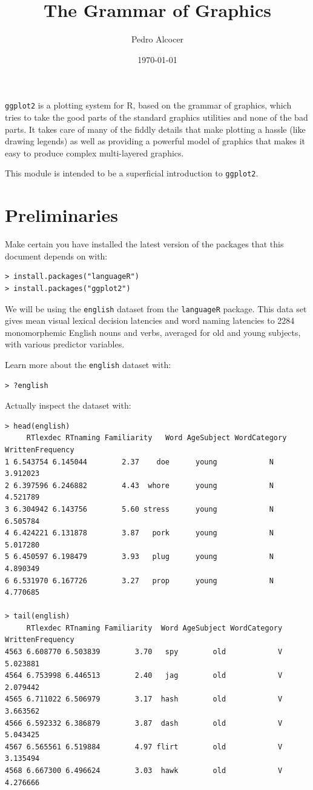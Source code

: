 \documentclass[oneside, 10pt]{article}
\title{The Grammar of Graphics}
\author{Pedro Alcocer}
\date{\today}
\begin{document}
\maketitle

\noindent\texttt{ggplot2} is a plotting system for R, based on the grammar of graphics, which tries to take the good parts of the standard graphics utilities and none of the bad parts. It takes care of many of the fiddly details that make plotting a hassle (like drawing legends) as well as providing a powerful model of graphics that makes it easy to produce complex multi-layered graphics.

This module is intended to be a superficial introduction to \texttt{ggplot2}.

\section{Preliminaries}

Make certain you have installed the latest version of the packages that this document depends on with:

\begin{verbatim}
> install.packages("languageR")
> install.packages("ggplot2")
\end{verbatim}

We will be using the \texttt{english} dataset from the \texttt{languageR} package. This data set gives mean visual lexical decision latencies and word naming latencies to 2284 monomorphemic English nouns and verbs, averaged for old and young subjects, with various predictor variables.

Learn more about the \texttt{english} dataset with:

\begin{verbatim}
> ?english
\end{verbatim}

Actually inspect the dataset with:

\begin{verbatim}
> head(english)
     RTlexdec RTnaming Familiarity   Word AgeSubject WordCategory WrittenFrequency
1 6.543754 6.145044        2.37    doe      young            N         3.912023
2 6.397596 6.246882        4.43  whore      young            N         4.521789
3 6.304942 6.143756        5.60 stress      young            N         6.505784
4 6.424221 6.131878        3.87   pork      young            N         5.017280
5 6.450597 6.198479        3.93   plug      young            N         4.890349
6 6.531970 6.167726        3.27   prop      young            N         4.770685

> tail(english)
     RTlexdec RTnaming Familiarity  Word AgeSubject WordCategory WrittenFrequency
4563 6.608770 6.503839        3.70   spy        old            V         5.023881
4564 6.753998 6.446513        2.40   jag        old            V         2.079442
4565 6.711022 6.506979        3.17  hash        old            V         3.663562
4566 6.592332 6.386879        3.87  dash        old            V         5.043425
4567 6.565561 6.519884        4.97 flirt        old            V         3.135494
4568 6.667300 6.496624        3.03  hawk        old            V         4.276666
\end{verbatim}
\end{document}

